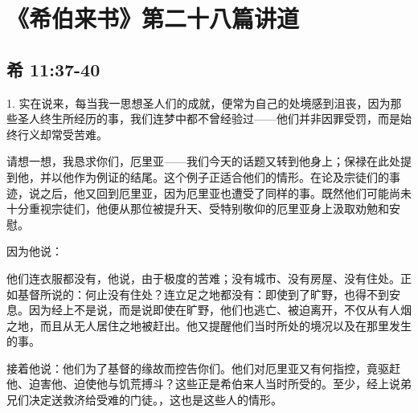 

\section{《希伯来书》第二十八篇讲道}


\subsection{希 11:37-40}

\par

1. 实在说来，每当我一思想圣人们的成就，便常为自己的处境感到沮丧，因为那些圣人终生所经历的事，我们连梦中都不曾经验过——他们并非因罪受罚，而是始终行义却常受苦难。\par

请想一想，我恳求你们，厄里亚——我们今天的话题又转到他身上；保禄在此处提到他，并以他作为例证的结尾。这个例子正适合他们的情形。在论及宗徒们的事迹，说之后，他又回到厄里亚，因为厄里亚也遭受了同样的事。既然他们可能尚未十分重视宗徒们，他便从那位被提升天、受特别敬仰的厄里亚身上汲取劝勉和安慰。\par

因为他说：\par

他们连衣服都没有，他说，由于极度的苦难；没有城市、没有房屋、没有住处。正如基督所说的：何止没有住处？连立足之地都没有：即使到了旷野，也得不到安息。因为经上不是说，而是说即使在旷野，他们也逃亡、被迫离开，不仅从有人烟之地，而且从无人居住之地被赶出。他又提醒他们当时所处的境况以及在那里发生的事。\par

接着他说：他们为了基督的缘故而控告你们。他们对厄里亚又有何指控，竟驱赶他、迫害他、迫使他与饥荒搏斗？这些正是希伯来人当时所受的。至少，经上说弟兄们决定送救济给受难的门徒。，这也是这些人的情形。\par

